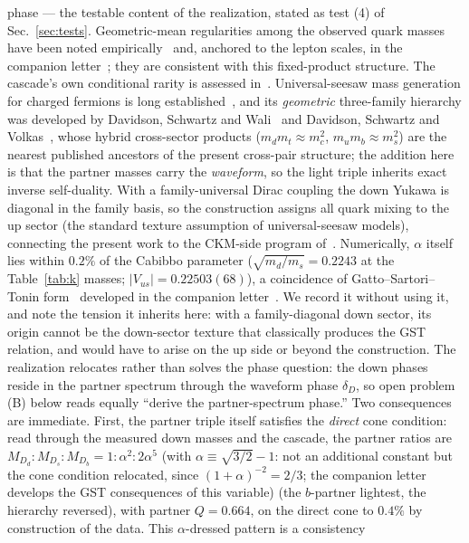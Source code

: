 \documentclass[11pt]{article}
\begin{document}
phase --- the testable content of the realization, stated as test (4) of
Sec.~\ref{sec:tests}. Geometric-mean regularities among the observed quark masses have been noted empirically~\cite{Ng} and, anchored to the lepton scales, in the companion letter~\cite{MPLA}; they are consistent with this fixed-product structure. The cascade's own conditional rarity is assessed in~\cite{APPB}. Universal-seesaw mass generation for charged
fermions is long established~\cite{Berezhiani,DavidsonWali}, and its
\emph{geometric} three-family hierarchy was developed by Davidson, Schwartz and
Wali~\cite{DSW} and Davidson, Schwartz and Volkas~\cite{DSV}, whose hybrid
cross-sector products ($m_d m_t \approx m_c^2$, $m_u m_b \approx m_s^2$) are the
nearest published ancestors of the present cross-pair structure; the addition here is that the partner masses carry the \emph{waveform}, so the light triple inherits exact inverse self-duality. With a family-universal Dirac coupling the down Yukawa is diagonal in the family basis, so the construction assigns all quark mixing to the up sector (the standard texture assumption of universal-seesaw models), connecting the present work to the CKM-side program of~\cite{Zen2012,Zen2013}. Numerically, $\alpha$ itself lies within $0.2\%$ of the Cabibbo parameter ($\sqrt{m_d/m_s} = 0.2243$ at the Table~\ref{tab:k} masses; $|V_{us}| = 0.22503(68)$), a coincidence of Gatto--Sartori--Tonin form~\cite{GST} developed in the companion letter~\cite{MPLA}. We record it without using it, and note the tension it inherits here: with a family-diagonal down sector, its origin cannot be the down-sector texture that classically produces the GST relation, and would have to arise on the up side or beyond the construction. The realization relocates rather than solves the phase question: the down phases reside in the partner spectrum through the waveform phase $\delta_D$, so open problem (B) below reads equally ``derive the partner-spectrum phase.'' Two consequences are immediate. First, the partner triple itself satisfies the \emph{direct} cone condition: read through the measured down masses and the cascade, the partner ratios are $M_{D_d}:M_{D_s}:M_{D_b} = 1:\alpha^2:2\alpha^5$ (with $\alpha \equiv \sqrt{3/2}-1$: not an additional constant but the cone condition relocated, since $(1+\alpha)^{-2} = 2/3$; the companion letter~\cite{MPLA} develops the GST consequences of this variable) (the $b$-partner lightest, the hierarchy reversed), with partner $Q = 0.664$, on the direct cone to $0.4\%$ by
construction of the data. This $\alpha$-dressed pattern is a consistency
\end{document}

